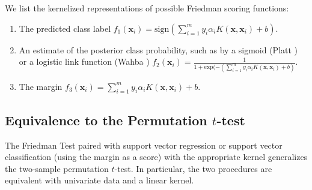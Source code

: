 We list the kernelized representations of possible Friedman scoring functions:
\begin{enumerate}
\item The predicted class label $f_1(\mathbf{x}_i)
= \text{sign}(\sum_{i=1}^m y_i \alpha_i K(\mathbf{x}, \mathbf{x}_i) + b)$.
\item An estimate of the posterior class probability, such as by a
sigmoid (Platt \cite{platt1999probabilistic, lin2007note}) or a
logistic link function (Wahba \cite{wahba1992multivariate,
wahba1999support})
$f_2(\mathbf{x}_i) = \frac{1}{1 + \text{exp}(-(\sum_{i=1}^m y_i \alpha_i K(\mathbf{x}, \mathbf{x}_i) + b)}$.
\item The margin $f_3(\mathbf{x}_i) = \sum_{i=1}^m y_i \alpha_i K(\mathbf{x}, \mathbf{x}_i) + b$.
\end{enumerate}

\subsection{Equivalence to the Permutation $t$-test}
\begin{theorem}
  \label{friedman_equiv}
  The Friedman Test paired with support vector regression
  or support vector classification (using the margin as a score)
  with the appropriate kernel generalizes
  the two-sample permutation $t$-test. In particular, the two procedures are
  equivalent with univariate data and a linear kernel.
\end{theorem}

